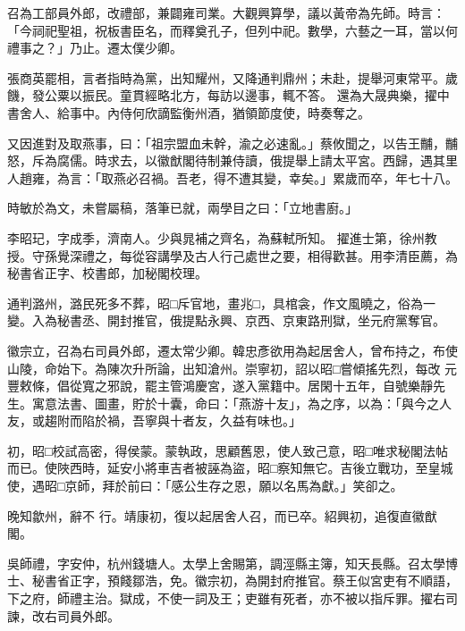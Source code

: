 \begin{pinyinscope}
 召為工部員外郎，改禮部，兼闢雍司業。大觀興算學，議以黃帝為先師。時言：「今祠祀聖祖，祝板書臣名，而釋奠孔子，但列中祀。數學，六藝之一耳，當以何禮事之？」乃止。遷太僕少卿。



 張商英罷相，言者指時為黨，出知耀州，又降通判鼎州；未赴，提舉河東常平。歲饑，發公粟以振民。童貫經略北方，每訪以邊事，輒不答。
 還為大晟典樂，擢中書舍人、給事中。內侍何欣謫監衡州酒，猶領節度使，時奏奪之。



 又因進對及取燕事，曰：「祖宗盟血未幹，渝之必速亂。」蔡攸聞之，以告王黼，黼怒，斥為腐儒。時求去，以徽猷閣待制兼侍讀，俄提舉上請太平宮。西歸，遇其里人趙雍，為言：「取燕必召禍。吾老，得不遭其變，幸矣。」累歲而卒，年七十八。



 時敏於為文，未嘗屬稿，落筆已就，兩學目之曰：「立地書廚。」



 李昭玘，字成季，濟南人。少與晁補之齊名，為蘇軾所知。
 擢進士第，徐州教授。守孫覺深禮之，每從容講學及古人行己處世之要，相得歡甚。用李清臣薦，為秘書省正字、校書郎，加秘閣校理。



 通判潞州，潞民死多不葬，昭□斥官地，畫兆□，具棺衾，作文風曉之，俗為一變。入為秘書丞、開封推官，俄提點永興、京西、京東路刑獄，坐元府黨奪官。



 徽宗立，召為右司員外郎，遷太常少卿。韓忠彥欲用為起居舍人，曾布持之，布使山陵，命始下。為陳次升所論，出知滄州。崇寧初，詔以昭□嘗傾搖先烈，每改
 元豐敕條，倡從寬之邪說，罷主管鴻慶宮，遂入黨籍中。居閑十五年，自號樂靜先生。寓意法書、圖畫，貯於十囊，命曰：「燕游十友」，為之序，以為：「與今之人友，或趨附而陷於禍，吾寧與十者友，久益有味也。」



 初，昭□校試高密，得侯蒙。蒙執政，思顧舊恩，使人致己意，昭□唯求秘閣法帖而已。使陜西時，延安小將車吉者被誣為盜，昭□察知無它。吉後立戰功，至皇城使，遇昭□京師，拜於前曰：「感公生存之恩，願以名馬為獻。」笑卻之。



 晚知歙州，辭不
 行。靖康初，復以起居舍人召，而已卒。紹興初，追復直徽猷閣。



 吳師禮，字安仲，杭州錢塘人。太學上舍賜第，調涇縣主簿，知天長縣。召太學博士、秘書省正字，預餞鄒浩，免。徽宗初，為開封府推官。蔡王似宮吏有不順語，下之府，師禮主治。獄成，不使一詞及王；吏雖有死者，亦不被以指斥罪。擢右司諫，改右司員外郎。




\end{pinyinscope}

